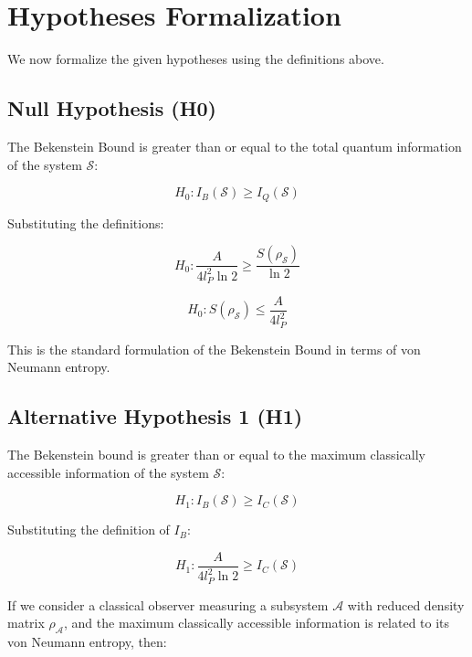 	\section{Hypotheses Formalization}
	
	We now formalize the given hypotheses using the definitions above.
	
	\subsection{Null Hypothesis (H0)}
	
	The Bekenstein Bound is greater than or equal to the total quantum information of the system $\mathcal{S}$:
	
	\begin{equation*}
		H_0: I_B(\mathcal{S}) \ge I_Q(\mathcal{S})
	\end{equation*}
	
	Substituting the definitions:
	
	\begin{equation*}
		H_0: \frac{A}{4 l_P^2 \ln 2} \ge \frac{S(\rho_{\mathcal{S}})}{\ln 2}
	\end{equation*}
	
	\begin{equation*}
		H_0: S(\rho_{\mathcal{S}}) \le \frac{A}{4 l_P^2}
	\end{equation*}
	
	This is the standard formulation of the Bekenstein Bound in terms of von Neumann entropy.
	
	\subsection{Alternative Hypothesis 1 (H1)}
	
	The Bekenstein bound is greater than or equal to the maximum classically accessible information of the system $\mathcal{S}$:
	
	\begin{equation*}
		H_1: I_B(\mathcal{S}) \ge I_C(\mathcal{S})
	\end{equation*}
	
	Substituting the definition of $I_B$:
	
	\begin{equation*}
		H_1: \frac{A}{4 l_P^2 \ln 2} \ge I_C(\mathcal{S})
	\end{equation*}
	
	If we consider a classical observer measuring a subsystem $\mathcal{A}$ with reduced density matrix $\rho_{\mathcal{A}}$, and the maximum classically accessible information is related to its von Neumann entropy, then:
	
